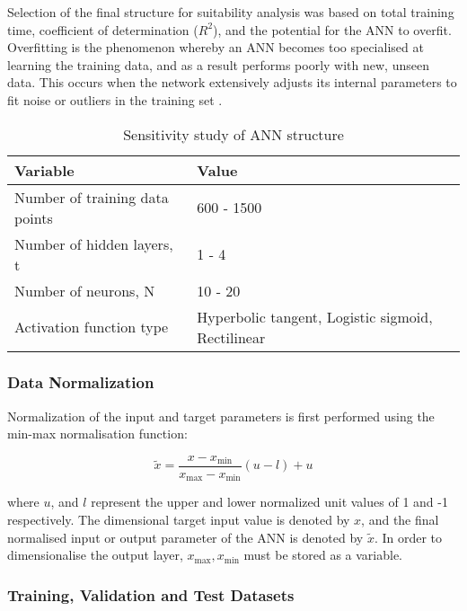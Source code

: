 Selection of the final structure for suitability analysis was based on total training time, coefficient of determination ($R^2$), and the potential for the ANN to overfit. Overfitting is the phenomenon whereby an ANN becomes too specialised at learning the training data, and as a result performs poorly with new, unseen data. This occurs when the network extensively adjusts its internal parameters to fit noise or outliers in the training set \cite{Ying2019}.

\begin{table*}
	\caption{Sensitivity study of ANN structure}
	\label{Sensitivity study of ANN structure}
	\centering
	\renewcommand{\arraystretch}{1.5}%
	\begin{tabular}{|P{0.4\textwidth}|P{0.4\textwidth}|}
		\hline
		\textbf{Variable} & \textbf{Value} \\ [0.5ex]
		\hline
		Number of training data points & 600 - 1500 \\ [0.5ex]
		\hline
		Number of hidden layers, t & 1 - 4 \\ [0.5ex]
		\hline
		Number of neurons, N & 10 - 20 \\ [0.5ex]
	    \hline
		Activation function type & Hyperbolic tangent, Logistic sigmoid, Rectilinear \\ [0.5ex]
		\hline
	\end{tabular}
\end{table*}

\subsubsection{Data Normalization}

Normalization of the input and target parameters is first performed using the min-max normalisation function:

\begin{equation}
	\tilde{x}=\frac{x-x_{\min }}{x_{\max }-x_{\min }}(u-l)+u
\end{equation}

where $u$, and $l$ represent the upper and lower normalized unit values of 1 and -1 respectively. The dimensional target input value is denoted by $x$, and the final normalised input or output parameter of the ANN is denoted by $\tilde{x}$. In order to dimensionalise the output layer, $x_{\max }, x_{\min }$ must be stored as a variable.

\subsubsection{Training, Validation and Test Datasets}

